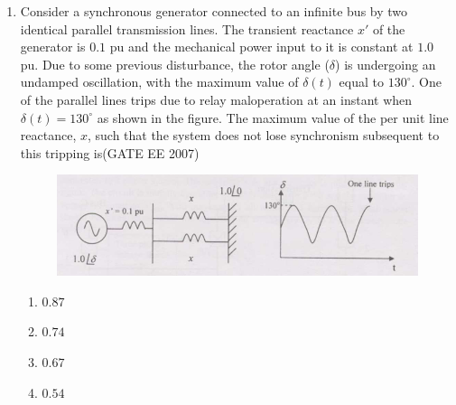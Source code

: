 \documentclass[a4paper,10pt]{exam}
\theoremstyle{remark}
\begin{document}
\begin{enumerate}
$
\text{If}\ R = 
\myvec{
v_{an} & v_{bn} & v_{cn}
}
\myvec{
0 & \frac{1}{\sqrt{3}} & -\frac{1}{\sqrt{3}} \\
-\frac{1}{\sqrt{3}} & 0 & \frac{1}{\sqrt{3}} \\
\frac{1}{\sqrt{3}} & -\frac{1}{\sqrt{3}} & 0
}
\myvec{
i_a \\ i_b \\ i_c
},\ 
\text{then the magnitude of $R$ is}
$


\vspace{1cm}
\begin{multicols}{4}
\begin{enumerate}
\item  $3VI$
\item  $VI$
\item  $0.7VI$
\item  $0$
\end{enumerate}
\end{multicols}

\vfill
{}
\newpage

\item  \quad
Consider a synchronous generator connected to an infinite bus by two identical parallel transmission lines. The transient reactance $x'$ of the generator is $0.1$ pu and the mechanical power input to it is constant at $1.0$ pu. Due to some previous disturbance, the rotor angle ($\delta$) is undergoing an undamped oscillation, with the maximum value of $\delta(t)$ equal to $130^\circ$. One of the parallel lines trips due to relay maloperation at an instant when $\delta(t) = 130^\circ$ as shown in the figure. The maximum value of the per unit line reactance, $x$, such that the system does not lose synchronism subsequent to this tripping is\hfill{(GATE EE 2007)} 

\begin{figure}[H]
    \centering
    \includegraphics[width=0.7\linewidth]{figs/Q 30 2007.png} 
    \caption{}
    \label{fig:myfigure}
\end{figure}

\begin{multicols}{4}
\begin{enumerate}
\item  $0.87$
\item  $0.74$
\item  $0.67$
\item  $0.54$
\end{enumerate}
\end{multicols}


\end{enumerate}
\end{document}
